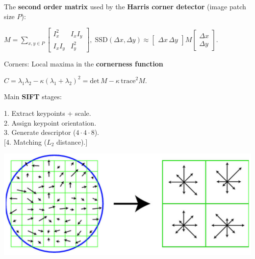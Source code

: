 \documentclass[landscape]{article}
\newcommand{\vmspace}{\vspace{-7pt}}
\newcommand{\vpspace}{\vspace{5pt}}
\begin{document}
\begin{multicols}{3}
\begin{minipage}{\columnwidth}
  The \textbf{second order matrix} used by the \textbf{Harris corner detector}
  (image patch size $P$):
  \vmspace
  \begin{center}
    $M = \sum\limits_{x, y \in P}
    \left[
    \begin{matrix}
      I_x^2 & I_x I_y \\
      I_x I_y & I_y^2
    \end{matrix}
    \right],\;
    \mathrm{SSD}(\Delta x, \Delta y)
    \approx
    \left[
    \begin{matrix}
      \Delta x\,\Delta y
    \end{matrix}
    \right]
    M
    \left[
    \begin{matrix}
      \Delta x \\
      \Delta y
    \end{matrix}
    \right].
    $
  \end{center}
  \vmspace
  Corners: Local maxima in the \textbf{cornerness function}
  \vmspace
  \begin{center}
    $C = \lambda_1\lambda_2 - \kappa (\lambda_1 + \lambda_2)^2
    = \mathrm{det}\,M - \kappa\,\mathrm{trace}^2 M.$
  \end{center}
\end{minipage}

\vpspace

\begin{minipage}{\columnwidth}
  Main \textbf{SIFT} stages: \\[-2pt]
  \begin{minipage}{\columnwidth}
    \begin{minipage}{0.5\columnwidth}
      1. Extract keypoints + scale. \\
      2. Assign keypoint orientation. \\
      3. Generate descriptor ($4\cdot 4\cdot 8$). \\
      $[$4. Matching ($L_2$ distance).$]$
    \end{minipage}
    \begin{minipage}{0.49\columnwidth}
      \includegraphics[width=\columnwidth]{img/6_SIFT.png}
    \end{minipage}
  \end{minipage}
\end{minipage}


\end{multicols}
\end{document}
